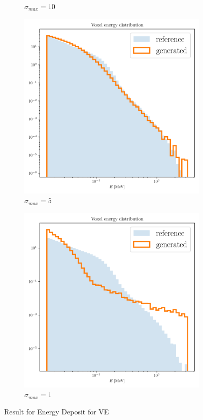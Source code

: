 \begin{figure}
\begin{subfigure}[b]{0.23\textwidth}
        \caption{$\sigma_{max}=10$}
        \label{fig:ve10_7}
    \end{subfigure}
    \hfill
    \begin{subfigure}[b]{0.23\textwidth}
        \centering
        \includegraphics[width=\textwidth]{Figures/ve5_7.png}
        \caption{$\sigma_{max}=5$}
        \label{fig:ve5_7}
    \end{subfigure}
    \hfill
    \begin{subfigure}[b]{0.23\textwidth}  %
        \centering
        \includegraphics[width=\textwidth]{Figures/ve1_7.png}
        \caption{$\sigma_{max}=1$}
        \label{fig:ve1_7}
    \end{subfigure}
    \caption{Result for Energy Deposit for VE}
\end{figure}

